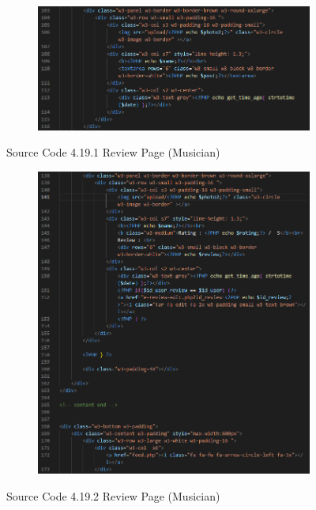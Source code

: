 \begin{enumerate}[1.]
\begin{figure}[h]
\begin{subfigure}[b]{0.7\textwidth}
            \centering
            \includegraphics[width=\textwidth]{mainmatter/images/frontend/code/mreview2.png}
            \label{fig:sub2}
        \end{subfigure}
        \caption*{Source Code 4.19.1 Review Page (Musician)}
        \label{fig:myfig58a}
    \end{figure}
    \begin{figure}[h]\ContinuedFloat
        \centering
        \begin{subfigure}[b]{0.7\textwidth}
            \centering
            \includegraphics[width=\textwidth]{mainmatter/images/frontend/code/mreview3.png}
            \label{fig:sub3}
        \end{subfigure}
        \caption*{Source Code 4.19.2 Review Page (Musician)}
        \label{fig:myfig58b}
    \end{figure}


\end{enumerate}
